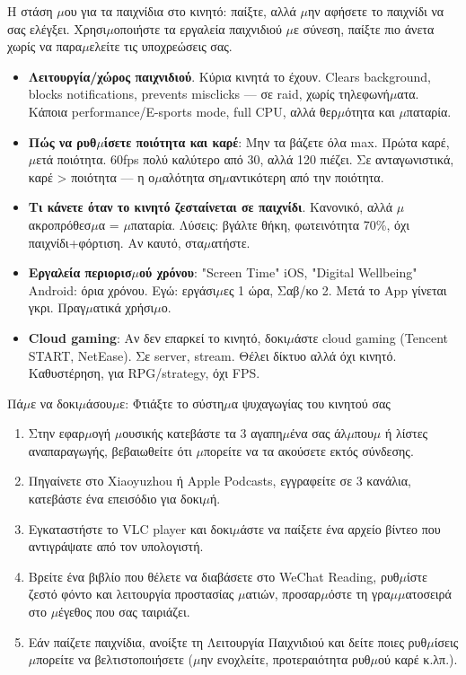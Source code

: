 
Η στάση $\mu$ου για τα παιχνίδια στο κινητό: παίξτε, αλλά $\mu$ην αφήσετε το παιχνίδι να σας ελέγξει. Χρησι$\mu$οποιήστε τα εργαλεία παιχνιδιού $\mu$ε σύνεση, παίξτε πιο άνετα χωρίς να παρα$\mu$ελείτε τις υποχρεώσεις σας.

\begin{itemize}
  \item \textbf{Λειτουργία/χώρος παιχνιδιού}. Κύρια κινητά το έχουν. Clears background, blocks notifications, prevents misclicks — σε raid, χωρίς τηλεφωνή$\mu$ατα. Κάποια performance/E-sports mode, full CPU, αλλά θερ$\mu$ότητα και $\mu$παταρία.
  \item \textbf{Πώς να ρυθ$\mu$ίσετε ποιότητα και καρέ}: Μην τα βάζετε όλα max. Πρώτα καρέ, $\mu$ετά ποιότητα. 60fps πολύ καλύτερο από 30, αλλά 120 πιέζει. Σε ανταγωνιστικά, καρέ > ποιότητα — η ο$\mu$αλότητα ση$\mu$αντικότερη από την ποιότητα.
  \item \textbf{Τι κάνετε όταν το κινητό ζεσταίνεται σε παιχνίδι}. Κανονικό, αλλά $\mu$ακροπρόθεσ$\mu$α = $\mu$παταρία. Λύσεις: βγάλτε θήκη, φωτεινότητα 70\%, όχι παιχνίδι+φόρτιση. Αν καυτό, στα$\mu$ατήστε.
  \item \textbf{Εργαλεία περιορισ$\mu$ού χρόνου}: "Screen Time" iOS, "Digital Wellbeing" Android: όρια χρόνου. Εγώ: εργάσι$\mu$ες 1 ώρα, Σαβ/κο 2. Μετά το App γίνεται γκρι. Πραγ$\mu$ατικά χρήσι$\mu$ο.
  \item \textbf{Cloud gaming}: Αν δεν επαρκεί το κινητό, δοκι$\mu$άστε cloud gaming (Tencent START, NetEase). Σε server, stream. Θέλει δίκτυο αλλά όχι κινητό. Καθυστέρηση, για RPG/strategy, όχι FPS.
\end{itemize}

\begin{tcbpractice}{Πά$\mu$ε να δοκι$\mu$άσου$\mu$ε: Φτιάξτε το σύστη$\mu$α ψυχαγωγίας του κινητού σας}
\begin{enumerate}
  \item Στην εφαρ$\mu$ογή $\mu$ουσικής κατεβάστε τα 3 αγαπη$\mu$ένα σας άλ$\mu$που$\mu$ ή λίστες αναπαραγωγής, βεβαιωθείτε ότι $\mu$πορείτε να τα ακούσετε εκτός σύνδεσης.
  \item Πηγαίνετε στο Xiaoyuzhou ή Apple Podcasts, εγγραφείτε σε 3 κανάλια, κατεβάστε ένα επεισόδιο για δοκι$\mu$ή.
  \item Εγκαταστήστε το VLC player και δοκι$\mu$άστε να παίξετε ένα αρχείο βίντεο που αντιγράψατε από τον υπολογιστή.
  \item Βρείτε ένα βιβλίο που θέλετε να διαβάσετε στο WeChat Reading, ρυθ$\mu$ίστε ζεστό φόντο και λειτουργία προστασίας $\mu$ατιών, προσαρ$\mu$όστε τη γρα$\mu$$\mu$ατοσειρά στο $\mu$έγεθος που σας ταιριάζει.
  \item Εάν παίζετε παιχνίδια, ανοίξτε τη Λειτουργία Παιχνιδιού και δείτε ποιες ρυθ$\mu$ίσεις $\mu$πορείτε να βελτιστοποιήσετε ($\mu$ην ενοχλείτε, προτεραιότητα ρυθ$\mu$ού καρέ κ.λπ.).
\end{enumerate}

\end{tcbpractice}
